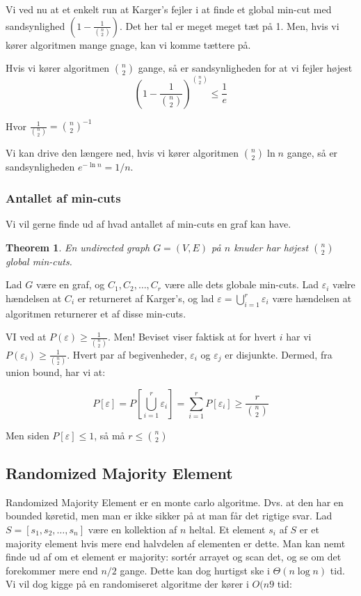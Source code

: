 \documentclass[11pt]{article}
\newtheorem{theorem}{Theorem}
\theoremstyle{definition}
\theoremstyle{remark}
\begin{document}
Vi ved nu at et enkelt run at Karger's fejler i at finde et global min-cut med sandsynlighed $( 1 - \frac{1}{\binom{n}{2}})$. Det her tal er meget meget tæt på 1. Men, hvis vi kører algoritmen mange gnage, kan vi komme tættere på.

Hvis vi kører algoritmen $\binom{n}{2}$ gange, så er sandsynligheden for at vi fejler højest
\[
\left(1- \frac{1}{\binom{n}{2}}  \right)^{\binom{n}{2}} \leq \frac{1}{e}
\]

Hvor $\frac{1}{\binom{n}{2}} = \binom{n}{2}^{-1}$

Vi kan drive den længere ned, hvis vi kører algoritmen $\binom{n}{2} \ln n$ gange, så er sandsynligheden $e^{- \ln n} = 1/n$.

\subsubsection{Antallet af min-cuts}

Vi vil gerne finde ud af hvad antallet af min-cuts en graf kan have.

\begin{theorem}
En undirected graph $G = (V,E)$ på $n$ knuder har højest $\binom{n}{2}$ global min-cuts. 
\end{theorem}

Lad $G$ være en graf, og $C_{1}, C_{2}, \ldots, C_{r}$ være alle dets globale min-cuts. Lad $\varepsilon_{i}$ vælre hændelsen at $C_{i}$ er returneret af Karger's, og lad $\varepsilon = \bigcup\limits_{i=1}^{r} \varepsilon_{i}$ være hændelsen at algoritmen returnerer et af disse min-cuts.

VI ved at $P(\varepsilon) \geq \frac{1}{\binom{n}{2}}$. Men! Beviset viser faktisk at for hvert $i$ har vi $P(\varepsilon_{i}) \geq \frac{1}{\binom{n}{2}}$. Hvert par af begivenheder, $\varepsilon_{i}$ og $\varepsilon_{j}$ er disjunkte. Dermed, fra union bound, har vi at:

\[
P[\varepsilon] = P[\bigcup\limits_{i=1}^{r} \varepsilon_{i}] = \sum_{i=1}^{r} P[\varepsilon_{i}] \geq \frac{r}{\binom{n}{2}}
\]

Men siden $P[\varepsilon] \leq 1$, så må $r \leq \binom{n}{2}$




\subsection{Randomized Majority Element}
\label{subsec:majorityelement}

Randomized Majority Element er en monte carlo algoritme. Dvs. at den har en bounded køretid, men man er ikke sikker på at man får det rigtige svar. Lad $S = [s_{1}, s_{2}, \ldots, s_{n}]$ være en kollektion af $n$ heltal. Et element $s_{i}$ af $S$ er et majority element hvis mere end halvdelen af elementen er dette. Man kan nemt finde ud af om et element er majority: sortér arrayet og scan det, og se om det forekommer mere end $n/2$ gange. Dette kan dog hurtigst ske i $\Theta(n \log n)$ tid. Vi vil dog kigge på en randomiseret algoritme der kører i $O(n9$ tid:
\end{document}
